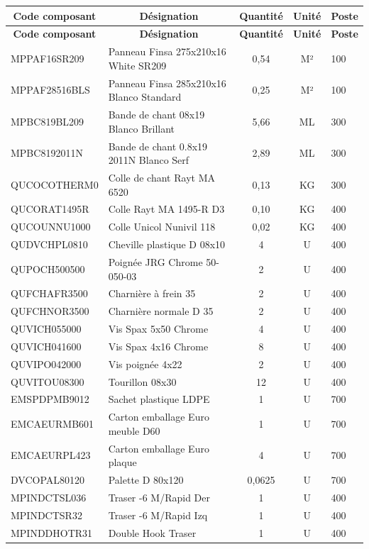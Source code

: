 \documentclass[12pt,a4paper]{article}
\begin{document}
\begin{longtable}{|p{3.5cm}|p{6cm}|c|c|p{2.5cm}|}
\hline
\multicolumn{1}{|c|}{\textbf{Code composant}} & \multicolumn{1}{c|}{\textbf{Désignation}} & \multicolumn{1}{c|}{\textbf{Quantité}} & \multicolumn{1}{c|}{\textbf{Unité}} & \multicolumn{1}{c|}{\textbf{Poste}} \\
\hline
\endfirsthead
\hline
\multicolumn{1}{|c|}{\textbf{Code composant}} & \multicolumn{1}{c|}{\textbf{Désignation}} & \multicolumn{1}{c|}{\textbf{Quantité}} & \multicolumn{1}{c|}{\textbf{Unité}} & \multicolumn{1}{c|}{\textbf{Poste}} \\
\hline
\endhead
\hline
\endfoot
MPPAF16SR209 & Panneau Finsa 275x210x16 White SR209 & 0,54 & M² & 100 \\
MPPAF28516BLS & Panneau Finsa 285x210x16 Blanco Standard & 0,25 & M² & 100 \\
MPBC819BL209 & Bande de chant 08x19 Blanco Brillant & 5,66 & ML & 300 \\
MPBC8192011N & Bande de chant 0.8x19 2011N Blanco Serf & 2,89 & ML & 300 \\
QUCOCOTHERM0 & Colle de chant Rayt MA 6520 & 0,13 & KG & 300 \\
QUCORAT1495R & Colle Rayt MA 1495-R D3 & 0,10 & KG & 400 \\
QUCOUNNU1000 & Colle Unicol Nunivil 118 & 0,02 & KG & 400 \\
QUDVCHPL0810 & Cheville plastique D 08x10 & 4 & U & 400 \\
QUPOCH500500 & Poignée JRG Chrome 50-050-03 & 2 & U & 400 \\
QUFCHAFR3500 & Charnière à frein 35 & 2 & U & 400 \\
QUFCHNOR3500 & Charnière normale D 35 & 2 & U & 400 \\
QUVICH055000 & Vis Spax 5x50 Chrome & 4 & U & 400 \\
QUVICH041600 & Vis Spax 4x16 Chrome & 8 & U & 400 \\
QUVIPO042000 & Vis poignée 4x22 & 2 & U & 400 \\
QUVITOU08300 & Tourillon 08x30 & 12 & U & 400 \\
EMSPDPMB9012 & Sachet plastique LDPE & 1 & U & 700 \\
EMCAEURMB601 & Carton emballage Euro meuble D60 & 1 & U & 700 \\
EMCAEURPL423 & Carton emballage Euro plaque & 4 & U & 700 \\
DVCOPAL80120 & Palette D 80x120 & 0,0625 & U & 700 \\
MPINDCTSL036 & Traser -6 M/Rapid Der & 1 & U & 400 \\
MPINDCTSR32 & Traser -6 M/Rapid Izq & 1 & U & 400 \\
MPINDDHOTR31 & Double Hook Traser & 1 & U & 400 \\
\hline
\end{longtable}
\end{document}
